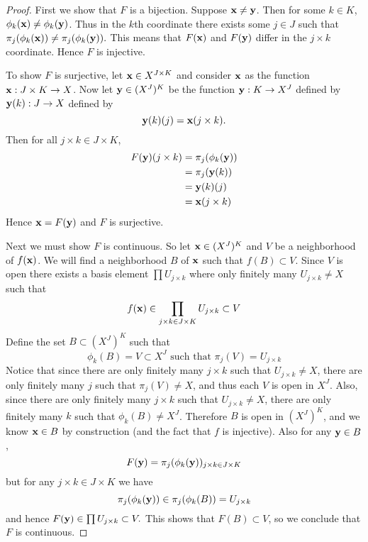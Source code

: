 \documentclass[11pt]{article}
\begin{document}
\begin{proof}
  First we show that $F$ is a bijection. Suppose $\vb x \neq \vb y$. Then for
  some $k \in K$, $\phi_k(\vb x) \neq \phi_k(\vb y)$. Thus in the $k$th
  coordinate there exists some $j \in J$ such that $\pi_j(\phi_k(\vb x)) \neq
  \pi_j(\phi_k(\vb y)).$ This means that $F(\vb x)$ and $F(\vb y)$
  differ in the $j \times k$ coordinate. Hence $F$ is injective.

  To show $F$ is surjective, let $\vb x \in X^{J\times K}$ and consider $\vb x$
  as the function $\vb x: J \times K \to X$. Now let $\vb y \in (X^J)^K$ be
  the function $\vb y: K \to X^J$ defined by $\vb y(k) : J \to X$ defined by
  \[ \vb y(k)(j) = \vb x(j \times k).\]
  Then for all $j \times k \in J \times K$,
  \begin{align*}
    F(\vb y)(j \times k) &= \pi_j(\phi_k(\vb y)) \\
      &= \pi_j(\vb y(k)) \\
      &= \vb y(k)(j) \\
      &= \vb x(j \times k)
  \end{align*}
  Hence $\vb x = F(\vb y)$ and $F$ is surjective.

  Next we must show $F$ is continuous. So let $\vb x \in (X^J)^K$ and $V$ be a
  neighborhood of $f(\vb x)$. We will find a neighborhood $B$ of $\vb x$ such that $f(B)
  \subset V$. Since $V$ is open there exists a basis element $\prod U_{j \times
  k}$ where only finitely many $U_{j \times k} \neq X$ such that
  \[ f(\vb x) \in \prod_{j\times k \in J \times K} U_{j \times k} \subset V\]
  Define the set $B \subset (X^J)^K$ such that
  \[ \phi_k(B) = V \subset X^J \text{ such that } \pi_j(V) = U_{j \times k} \]
  Notice that since there are only finitely many $j \times k$ such that $U_{j
  \times k} \neq X$, there are only finitely many $j$ such that $\pi_j(V) \neq
  X$, and thus each $V$ is open in $X^J$. Also, since there are only finitely
  many $j \times k$ such that $U_{j \times k} \neq X$, there are only finitely
  many $k$ such that $\phi_k(B) \neq X^J$. Therefore $B$ is open in $(X^J)^K$,
  and we know $\vb x \in B$ by construction (and the fact that $f$ is
  injective). Also for any $\vb y \in B$,
  \[ F(\vb y) = \pi_j(\phi_k(\vb y))_{j \times k \in J \times K} \]
  but for any $j \times k \in J \times K$ we have
  \[ \pi_j(\phi_k(\vb y)) \in \pi_j(\phi_k(B)) = U_{j \times k}\]
  and hence $F(\vb y) \in \prod U_{j \times k} \subset V.$ This shows that $F(B)
  \subset V$, so we conclude that $F$ is continuous.


\end{proof}
\end{document}

